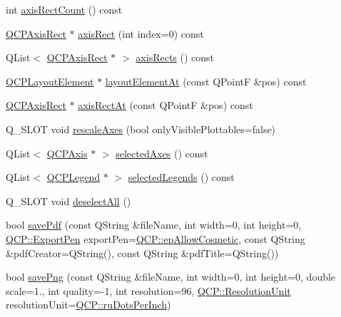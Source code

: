 \begin{DoxyCompactItemize}
\item 
int \hyperlink{classQCustomPlot_a8f85940aaac50efb466287d9d2d04ec6}{axis\+Rect\+Count} () const
\item 
\hyperlink{classQCPAxisRect}{Q\+C\+P\+Axis\+Rect} $\ast$ \hyperlink{classQCustomPlot_ae5eefcb5f6ca26689b1fd4f6e25b42f9}{axis\+Rect} (int index=0) const
\item 
Q\+List$<$ \hyperlink{classQCPAxisRect}{Q\+C\+P\+Axis\+Rect} $\ast$ $>$ \hyperlink{classQCustomPlot_a12af771429e2d7e313c8c5d5fca068fe}{axis\+Rects} () const
\item 
\hyperlink{classQCPLayoutElement}{Q\+C\+P\+Layout\+Element} $\ast$ \hyperlink{classQCustomPlot_afaa1d304e0287d140fd238e90889ef3c}{layout\+Element\+At} (const Q\+PointF \&pos) const
\item 
\hyperlink{classQCPAxisRect}{Q\+C\+P\+Axis\+Rect} $\ast$ \hyperlink{classQCustomPlot_a4a08842fc3e9ba6bed83aa410c5c5ba5}{axis\+Rect\+At} (const Q\+PointF \&pos) const
\item 
Q\+\_\+\+S\+L\+OT void \hyperlink{classQCustomPlot_ad86528f2cee6c7e446dea4a6e8839935}{rescale\+Axes} (bool only\+Visible\+Plottables=false)
\item 
Q\+List$<$ \hyperlink{classQCPAxis}{Q\+C\+P\+Axis} $\ast$ $>$ \hyperlink{classQCustomPlot_a7e6b07792b1cb2c31681596582d14dbe}{selected\+Axes} () const
\item 
Q\+List$<$ \hyperlink{classQCPLegend}{Q\+C\+P\+Legend} $\ast$ $>$ \hyperlink{classQCustomPlot_ac87624ddff1cbf4064781a8e8ae321c4}{selected\+Legends} () const
\item 
Q\+\_\+\+S\+L\+OT void \hyperlink{classQCustomPlot_a9d4808ab925b003054085246c92a257c}{deselect\+All} ()
\item 
bool \hyperlink{classQCustomPlot_ad5acd34f6b39c3516887d7e54fec2412}{save\+Pdf} (const Q\+String \&file\+Name, int width=0, int height=0, \hyperlink{namespaceQCP_a17844f19e1019693a953e1eb93536d2f}{Q\+C\+P\+::\+Export\+Pen} export\+Pen=\hyperlink{namespaceQCP_a17844f19e1019693a953e1eb93536d2fa50d3657dba3fb90560b93a823cb0a6e8}{Q\+C\+P\+::ep\+Allow\+Cosmetic}, const Q\+String \&pdf\+Creator=Q\+String(), const Q\+String \&pdf\+Title=Q\+String())
\item 
bool \hyperlink{classQCustomPlot_ac92cc9256d12f354b40a4be4600b5fb9}{save\+Png} (const Q\+String \&file\+Name, int width=0, int height=0, double scale=1., int quality=-\/1, int resolution=96, \hyperlink{namespaceQCP_a715d46153da230990aa887d0f0602452}{Q\+C\+P\+::\+Resolution\+Unit} resolution\+Unit=\hyperlink{namespaceQCP_a715d46153da230990aa887d0f0602452affb887d8efe79c39a1aca2acd7002afc}{Q\+C\+P\+::ru\+Dots\+Per\+Inch})

\end{DoxyCompactItemize}

